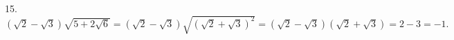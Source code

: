 15. $(\sqrt{2}-\sqrt{3})\sqrt{5+2\sqrt{6}}=(\sqrt{2}-\sqrt{3})\sqrt{(\sqrt{2}+\sqrt{3})^2}=(\sqrt{2}-\sqrt{3})(\sqrt{2}+\sqrt{3})=2-3=-1.$\\
